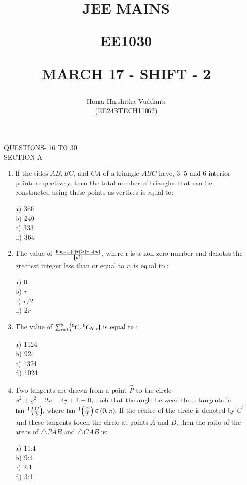\documentclass[journal]{IEEEtran}
\begin{document}


\title{
JEE MAINS

\large{EE1030}

MARCH 17 - SHIFT - 2
}
\author{Homa Harshitha Vuddanti

(EE24BTECH11062)
}	

\maketitle

\bigskip

\renewcommand{\thefigure}{\theenumi}
\renewcommand{\thetable}{\theenumi}
QUESTIONS- 16 TO 30\\
SECTION A
\begin{enumerate}
   
\item If the sides $AB, BC$, and $CA$ of a triangle $ABC$ have, 3, 5 and 6 interior points respectively, then the total number of triangles that can be constructed using these points as vertices is equal to:
\begin{multicols}{4}
    a) 360\\
    b) 240\\
    c) 333\\
    d) 364
\end{multicols}
 \item The value of $\frac{\lim_{r \to \infty}{}\left[r\right]+{}\left[2r\right]+\dots{}\left[nr\right]}{{}\left[n^2\right]}$, where r is a non-zero number and  denotes the greatest integer less than or equal to $r$, is equal to :
 \begin{multicols}{4}
     a) 0\\
     b) $r$\\
     c) $r/2$\\
     d) $2r$
 \end{multicols}
 
 \item The value of $\sum_{r=0}^{6}\left(^6C_r.^6C_{6-r}\right)$ is equal to :
 \begin{multicols}{4}
    a) 1124\\
    b) 924\\
    c) 1324\\
    d) 1024
 \end{multicols}
 
\item Two tangents are drawn from a point $\vec{P}$ to the circle $x^2 + y^2 -2x-4y+4=0$, such that the angle between these tangents is  $\tan^{-1}\left(\frac{12}{5}\right)$, where $\tan^{-1}\left(\frac{12}{5}\right)\in \left(0,\pi\right)$. If the centre of the circle is denoted by $\vec{C}$ and these tangents touch the circle at points $\vec{A}$ and $\vec{B}$, then the ratio of the areas of $\triangle PAB$ and $\triangle CAB$ is:
\begin{multicols}{4}
    a) 11:4\\
    b) 9:4\\
    c) 2:1\\
    d) 3:1
\end{multicols}


\end{enumerate}
\end{document}
